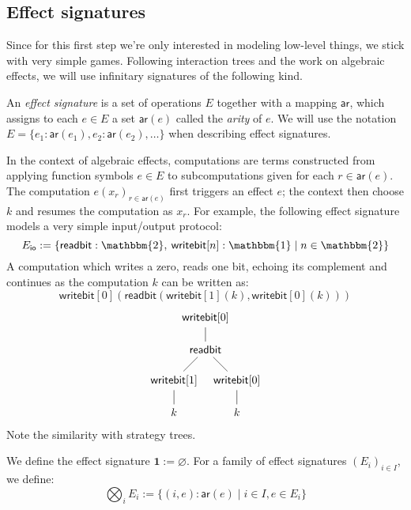 \documentclass[format=sigplan,authordraft]{acmart}
\newcommand{\kw}[1]{\ensuremath{ \mathsf{#1} }}
\begin{document}
\subsection{Effect signatures} %

Since for this first step
we're only interested in modeling
low-level things,
we stick with very simple games.
Following interaction trees and the work on
algebraic effects,
we will use infinitary signatures of the following kind.

\begin{definition}
An \emph{effect signature}
is a set of operations $E$
together with a mapping $\kw{ar}$,
which assigns to each $e \in E$ a set $\kw{ar}(e)$
called the \emph{arity} of $e$.
We will use the notation
$E = \{ e_1 : \kw{ar}(e_1), e_2 : \kw{ar}(e_2), \ldots \}$
when describing effect signatures.
\end{definition}

In the context of algebraic effects,
computations are terms constructed from
applying function symbols $e \in E$
to subcomputations given for each $r \in \kw{ar}(e)$.
The computation $e(x_r)_{r \in \kw{ar}(e)}$
first triggers an effect $e$;
the context then choose $k$
and resumes the computation as $x_r$.
For example,
the following effect signature
models a very simple input/output protocol:
\[
  E_\kw{io} :=
    \{ \kw{readbit} : \mathbbm{2}, \:
       \kw{writebit}[n] : \mathbbm{1} \mid
       n \in \mathbbm{2} \}
\]
A computation which writes a zero,
reads one bit, echoing its complement
and continues as the computation $k$
can be written as:
\[
  \kw{writebit}[0](
    \kw{readbit}(
      \kw{writebit}[1](k),
      \kw{writebit}[0](k)))
\]
\[
  \begin{tikzpicture}
    \node (W) at (0,0) {$\kw{writebit}[0]$};
    \node (R) at (0,-1) {$\kw{readbit}$};
    \node (W0) at (-1,-2) {$\kw{writebit}[1]$};
    \node (W1) at (+1,-2) {$\kw{writebit}[0]$};
    \node (K0) at (-1,-3) {$k$};
    \node (K1) at (+1,-3) {$k$};
    \path (W) edge (R);
    \path (R) edge (W0);
    \path (R) edge (W1);
    \path (W0) edge (K0);
    \path (W1) edge (K1);
  \end{tikzpicture}
\]
Note the similarity with strategy trees.

\begin{definition}
We define the effect signature
$\mathbf{1} := \varnothing$.
For a family of effect signatures $(E_i)_{i \in I}$,
we define:
\[
  \bigotimes_i E_i := \{ (i, e) : \kw{ar}(e) \mid i \in I, e \in E_i \}
\]
\end{definition}
\end{document}

